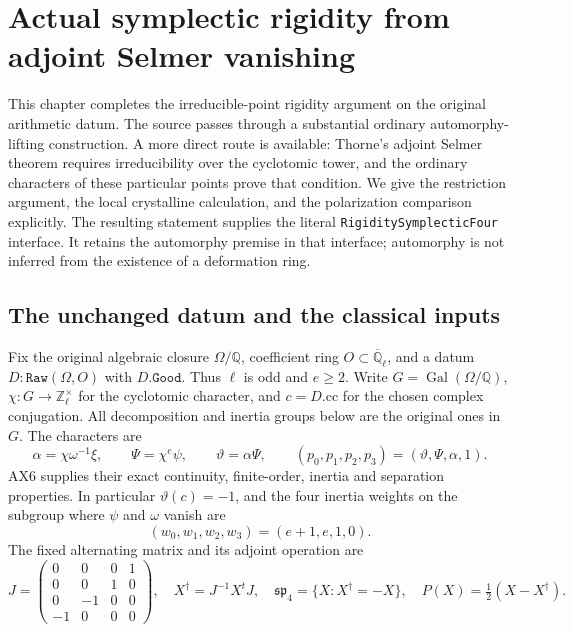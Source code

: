 \section{Actual symplectic rigidity from adjoint Selmer vanishing}
\label{sec:actual-symplectic-rigidity}

This chapter completes the irreducible-point rigidity argument on the
original arithmetic datum.  The source passes through a substantial
ordinary automorphy-lifting construction.  A more direct route is available:
Thorne's adjoint Selmer theorem requires irreducibility over the cyclotomic
tower, and the ordinary characters of these particular points prove that
condition.  We give the restriction argument, the local crystalline
calculation, and the polarization comparison explicitly.  The resulting
statement supplies the literal \texttt{RigiditySymplecticFour} interface.
It retains the automorphy premise in that interface; automorphy is not
inferred from the existence of a deformation ring.

\subsection{The unchanged datum and the classical inputs}

Fix the original algebraic closure $\Omega/\mathbb Q$, coefficient ring
$O\subset\overline{\mathbb Q}_\ell$, and a datum
$D:\texttt{Raw}(\Omega,O)$ with $D.\texttt{Good}$.  Thus $\ell$ is odd and
$e\ge2$.  Write $G=\operatorname{Gal}(\Omega/\mathbb Q)$,
$\chi:G\to\mathbb Z_\ell^\times$ for the cyclotomic character, and
$c=D.\mathrm{cc}$ for the chosen complex conjugation.  All decomposition
and inertia groups below are the original ones in $G$.  The characters are
\[
 \alpha=\chi\omega^{-1}\xi,\qquad
 \Psi=\chi^e\psi,\qquad \vartheta=\alpha\Psi,
 \qquad (p_0,p_1,p_2,p_3)=(\vartheta,\Psi,\alpha,1).
 \tag{RX.1}
\]
AX6 supplies their exact continuity, finite-order, inertia and separation
properties.  In particular $\vartheta(c)=-1$, and the four inertia weights
on the subgroup where $\psi$ and $\omega$ vanish are
\[
                    (w_0,w_1,w_2,w_3)=(e+1,e,1,0).
 \tag{RX.2}
\]
The fixed alternating matrix and its adjoint operation are
\[
 J=\begin{pmatrix}0&0&0&1\\0&0&1&0\\0&-1&0&0\\-1&0&0&0\end{pmatrix},
 \quad X^\dagger=J^{-1}X^tJ,\quad
 \mathfrak{sp}_4=\{X:X^\dagger=-X\},\quad
 P(X)=\tfrac12(X-X^\dagger).
 \tag{RX.3}
\]


